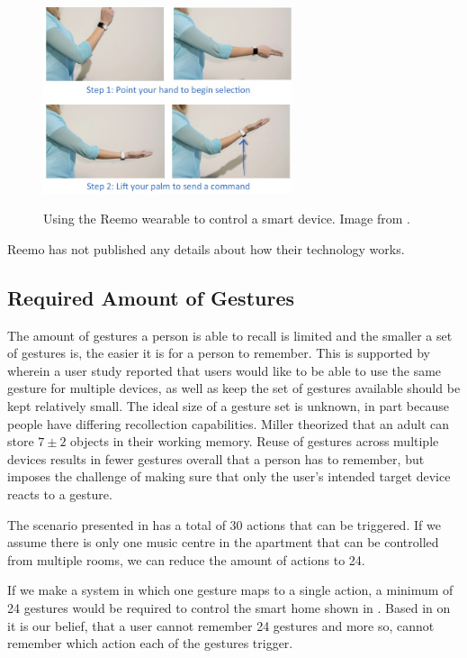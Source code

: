 \begin{figure}
\centering
\includegraphics[width=0.65\textwidth]{images/reemo}
\label{fig:introduction:gesture-control:reemo}
\caption{Using the Reemo wearable to control a smart device. Image from \cite{prespecialisation}.}
\end{figure}

Reemo has not published any details about how their technology works.

\subsection{Required Amount of Gestures}

The amount of gestures a person is able to recall is limited and the smaller a set of gestures is, the easier it is for a person to remember. This is supported by \cite{Kela2006} wherein a user study reported that users would like to be able to use the same gesture for multiple devices, as well as keep the set of gestures available should be kept relatively small.
The ideal size of a gesture set is unknown, in part because people have differing recollection capabilities. Miller \cite{miller1956magical} theorized that an adult can store $7 \pm 2$ objects in their working memory.
Reuse of gestures across multiple devices results in fewer gestures overall that a person has to remember, but imposes the challenge of making sure that only the user's intended target device reacts to a gesture.

The scenario presented in  has a total of 30 actions that can be triggered. If we assume there is only one music centre in the apartment that can be controlled from multiple rooms, we can reduce the amount of actions to 24.

If we make a system in which one gesture maps to a single action, a minimum of 24 gestures would be required to control the smart home shown in . Based in on \cite{Kela2006,miller1956magical} it is our belief, that a user cannot remember 24 gestures and more so, cannot remember which action each of the gestures trigger.

